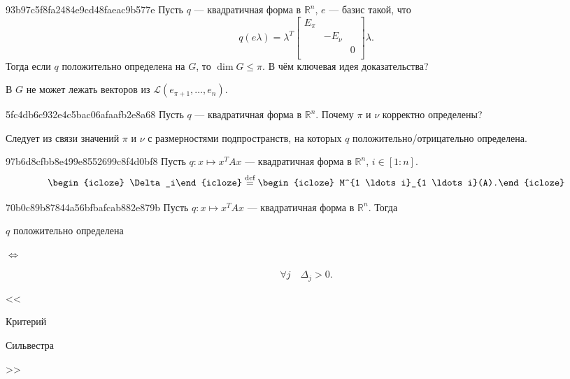 \begin{note}{93b97c5f8fa2484e9cd48faeac9b577e}
    Пусть \({ q }\) --- квадратичная форма в \({ \mathbb R^{n} }\),
    \({ e }\) --- базис такой, что
    \[
        q(e\lambda) = \lambda^{T} \begin{bmatrix}
            E_{\pi}   \\
            & -E_{\nu} \\
            && 0      \\
        \end{bmatrix}
        \lambda.
    \]
    Тогда если \({ q }\) положительно определена на \({ G }\), то \({ \dim G \leqslant \pi }\).
    В чём ключевая идея доказательства?

    \begin{cloze}{1}
        В \({ G }\) не может лежать векторов из \({ \mathscr L (e_{\pi + 1}, \ldots, e_n) }\).
    \end{cloze}
\end{note}

\begin{note}{5fc4db6c932e4c5bac06afaafb2e8a68}
    Пусть \({ q }\) --- квадратичная форма в \({ \mathbb R^{n} }\).
    Почему \({ \pi }\) и \({ \nu }\) корректно определены?

    \begin{cloze}{1}
        Следует из связи значений \({ \pi }\) и \({ \nu }\) с размерностями подпространств, на которых \({ q }\) положительно/отрицательно определена.
    \end{cloze}
\end{note}

\begin{note}{97b6d8cfbb8e499e8552699c8f4d0bf8}
    Пусть \({ q : x \mapsto x^{T}Ax }\) --- квадратичная форма в \({ \mathbb R^{n} }\),\: \({ i \in [1 : n] }\).
    \[
        \begin{icloze}{2}\Delta_i\end{icloze} \overset{\text{def}}= \begin{icloze}{1}M^{1 \ldots i}_{1 \ldots i}(A).\end{icloze}
    \]
\end{note}

\begin{note}{70b0c89b87844a56bfbafcab882e879b}
    Пусть \({ q : x \mapsto x^{T}Ax }\) --- квадратичная форма в \({ \mathbb R^{n} }\).
    Тогда \begin{icloze}{2}\({ q }\) положительно определена\end{icloze} \begin{icloze}{3}\({ \iff }\)\end{icloze}
    \begin{icloze}{1}
        \[
            \forall j \quad \Delta_j > 0.
        \]
    \end{icloze}

    \begin{center}
        \tiny <<\begin{icloze}{3}Критерий\end{icloze} \begin{icloze}{4}Сильвестра\end{icloze}>>
    \end{center}
\end{note}

